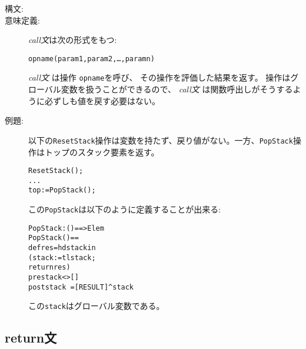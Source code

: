 \documentclass[\pformat,12pt]{jarticle}
\begin{document}
\begin{description}
\item[構文:]

\item[意味定義:]  {\it call文}は次の形式をもつ:
  \begin{alltt}
    opname(param1, param2, \ldots, paramn)
  \end{alltt}


 {\it call文} は操作 {\tt opname}を呼び、 %
その操作を評価した結果を返す。
操作はグローバル変数を扱うことができるので、 {\it call文} は関数呼出しがそうするように必ずしも値を戻す必要はない。


\item[例題:] \mbox{} 
  以下の{\tt ResetStack}操作は変数を持たず、戻り値がない。一方、{\tt PopStack}操作はトップのスタック要素を返す。
  \begin{alltt}
    ResetStack();
    ...
    top := PopStack();
  \end{alltt}
  この{\tt PopStack}は以下のように定義することが出来る:
  \begin{alltt}
    PopStack: () ==> Elem
    PopStack() ==
      def res = hd stack in
       (stack := tl stack;
        return res)
    pre stack <> []
    post stack~ = [RESULT] ^ stack
  \end{alltt}
  この{\tt stack}はグローバル変数である。

\end{description}

\subsection{return文}
\end{document}
